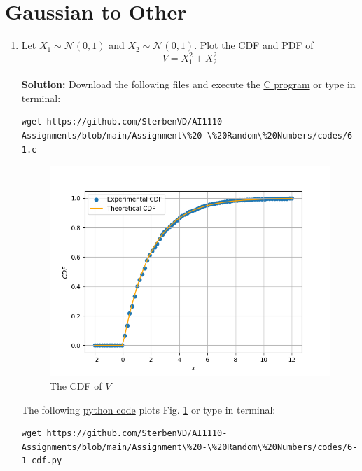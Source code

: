 \documentclass[journal,12pt,twocolumn]{IEEEtran}
\numberwithin{equation}{section}
\renewcommand\thesection{\arabic{section}}
\providecommand{\gauss}[2]{\mathcal{N}\ensuremath{\left(#1,#2\right)}}
\providecommand{\gitlink}[2]{{\color{blue}\href{https://github.com/SterbenVD/AI1110-Assignments/blob/main/Assignment\%20-\%20Random\%20Numbers/#1}{#2}}}
\newcommand{\solution}{\noindent \textbf{\\ Solution: }}
\begin{document}
\section{Gaussian to Other}
\begin{enumerate}[label=\thesection.\arabic*
        ,ref=\thesection.\theenumi]
    \item
          Let $X_1 \sim  \gauss{0}{1}$ and $X_2 \sim  \gauss{0}{1}$. Plot the CDF and PDF of
          \begin{equation}
              V = X_1^2 + X_2^2
          \end{equation}
          \solution Download the following files and execute the \gitlink{codes/6-1.c}{C program} or type in terminal:
          \begin{lstlisting}
wget https://github.com/SterbenVD/AI1110-Assignments/blob/main/Assignment\%20-\%20Random\%20Numbers/codes/6-1.c
                    \end{lstlisting}
          \begin{figure}[H]
              \centering
              \includegraphics[width = \columnwidth]{../figs/6-1_cdf}
              \caption{The CDF of $V$}
              \label{fig:6-1_cdf}
          \end{figure}
          The following \gitlink{codes/6-1_cdf.py}{python code} plots Fig. \ref{fig:6-1_cdf} or type in terminal:
          \begin{lstlisting}
wget https://github.com/SterbenVD/AI1110-Assignments/blob/main/Assignment\%20-\%20Random\%20Numbers/codes/6-1_cdf.py
                        \end{lstlisting}

\end{enumerate}
\end{document}
